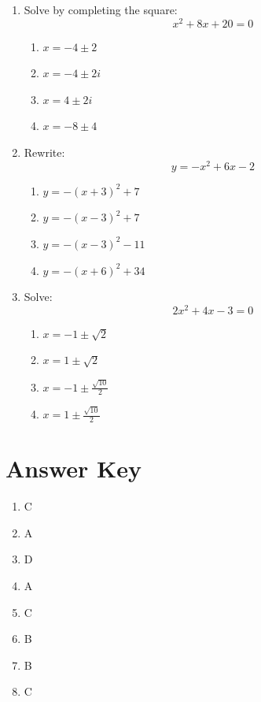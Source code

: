 \documentclass[12pt]{article}
\begin{document}
\begin{enumerate}
\item Solve by completing the square:
\[
x^2 + 8x + 20 = 0
\]
\begin{enumerate}
\item $x = -4 \pm 2$
\item $x = -4 \pm 2i$
\item $x = 4 \pm 2i$
\item $x = -8 \pm 4$
\end{enumerate}

\item Rewrite:
\[
y = -x^2 + 6x - 2
\]
\begin{enumerate}
\item $y = -(x+3)^2 + 7$
\item $y = -(x-3)^2 + 7$
\item $y = -(x-3)^2 - 11$
\item $y = -(x+6)^2 + 34$
\end{enumerate}

\item Solve:
\[
2x^2 + 4x - 3 = 0
\]
\begin{enumerate}
\item $x = -1 \pm \sqrt{2}$
\item $x = 1 \pm \sqrt{2}$
\item $x = -1 \pm \frac{\sqrt{10}}{2}$
\item $x = 1 \pm \frac{\sqrt{10}}{2}$
\end{enumerate}

\end{enumerate}

\newpage

\section*{Answer Key}

\begin{enumerate}
\item C
\item A
\item D
\item A
\item C
\item B
\item B
\item C
\end{enumerate}
\end{document}
